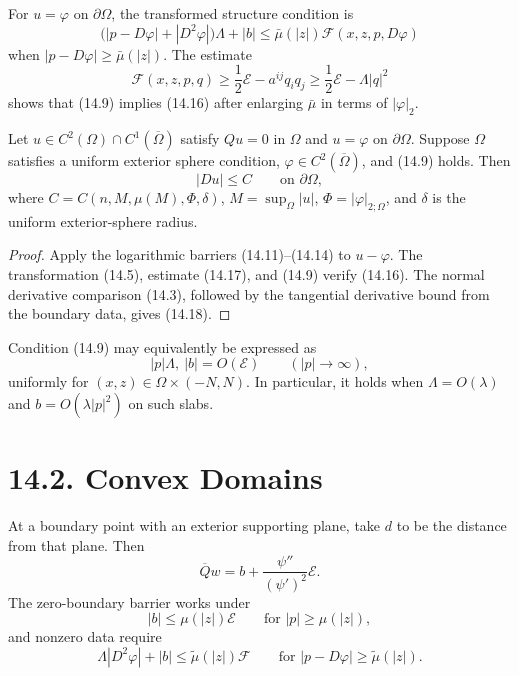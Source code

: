 For $u=\varphi$ on $\partial\Omega$, the transformed structure condition is
\begin{equation}
\bigl(|p-D\varphi|+|D^2\varphi|\bigr)\Lambda+|b|
\leq\bar\mu(|z|)\mathcal F(x,z,p,D\varphi)
\tag{14.16}
\end{equation}
when $|p-D\varphi|\geq\bar\mu(|z|)$. The estimate
\begin{equation}
\mathcal F(x,z,p,q)
\geq\frac12\mathcal E-a^{ij}q_iq_j
\geq\frac12\mathcal E-\Lambda|q|^2
\tag{14.17}
\end{equation}
shows that (14.9) implies (14.16) after enlarging $\bar\mu$ in terms of
$|\varphi|_2$.

\begin{theorem}
\label{gt14-boundary-gradient-14-1}
Let $u\in C^2(\Omega)\cap C^1(\overline\Omega)$ satisfy $Qu=0$ in $\Omega$
and $u=\varphi$ on $\partial\Omega$. Suppose $\Omega$ satisfies a uniform
exterior sphere condition, $\varphi\in C^2(\overline\Omega)$, and (14.9) holds.
Then
\begin{equation}
|Du|\leq C\qquad\text{on }\partial\Omega,
\tag{14.18}
\end{equation}
where $C=C(n,M,\mu(M),\Phi,\delta)$,
$M=\sup_\Omega|u|$, $\Phi=|\varphi|_{2;\Omega}$, and $\delta$ is the uniform
exterior-sphere radius.
\end{theorem}
\begin{proof}
\sketch Apply the logarithmic barriers (14.11)--(14.14) to $u-\varphi$.
The transformation (14.5), estimate (14.17), and (14.9) verify (14.16).
The normal derivative comparison (14.3), followed by the tangential derivative
bound from the boundary data, gives (14.18).
\end{proof}

Condition (14.9) may equivalently be expressed as
\begin{equation}
|p|\Lambda,\ |b|=O(\mathcal E)\qquad(|p|\to\infty),
\tag{14.19}
\end{equation}
uniformly for $(x,z)\in\Omega\times(-N,N)$. In particular, it holds when
$\Lambda=O(\lambda)$ and $b=O(\lambda|p|^2)$ on such slabs.

\section*{14.2. Convex Domains}

At a boundary point with an exterior supporting plane, take $d$ to be the
distance from that plane. Then
\begin{equation}
\overline Qw=b+\frac{\psi''}{(\psi')^2}\mathcal E.
\tag{14.20}
\end{equation}
The zero-boundary barrier works under
\begin{equation}
|b|\leq\mu(|z|)\mathcal E
\qquad\text{for }|p|\geq\mu(|z|),
\tag{14.21}
\end{equation}
and nonzero data require
\begin{equation}
\Lambda|D^2\varphi|+|b|
\leq\widetilde\mu(|z|)\mathcal F
\qquad\text{for }|p-D\varphi|\geq\widetilde\mu(|z|).
\tag{14.22}
\end{equation}

